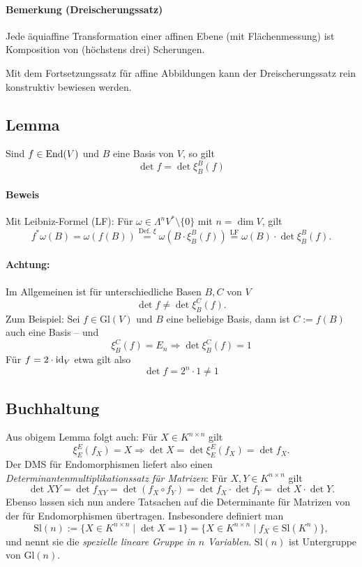 \paragraph{Bemerkung (Dreischerungssatz)}
	Jede äquiaffine Transformation einer affinen Ebene (mit Flächenmessung) ist Komposition von (höchstens drei) Scherungen.
	
	Mit dem Fortsetzungssatz für affine Abbildungen kann der Dreischerungssatz rein konstruktiv bewiesen werden.
\subsection{Lemma}
	Sind $ f\in \operatorname{End}(V) $ und $ B $ eine Basis von $ V $, so gilt
		\[ \det f = \det \xi_B^B(f) \]
\paragraph{Beweis}
	Mit Leibniz-Formel (LF): Für $ \omega\in \Lambda^nV^*\setminus\{0\} $ mit $ n=\dim V $, gilt
		\[ f^*\omega(B) = \omega(f(B)) \overset{\text{Def. }\xi}{=} \omega(B\cdot \xi_B^B(f))
		\overset{\text{LF}}{=} \omega(B)\cdot \det \xi_B^B(f).\]
\paragraph{Achtung:}
	Im Allgemeinen ist für unterschiedliche Basen $ B,C $ von $ V $
		\[ \det f \neq \det \xi_B^C(f). \]
	Zum Beispiel: Sei $ f\in \mathrm{Gl}(V) $ und $ B $ eine beliebige Basis, dann ist $ C:=f(B) $ auch eine Basis -- und 
		\[ \xi_B^C(f) = E_n \Rightarrow \det \xi_B^C(f) = 1 \]
	Für $ f=2\cdot \operatorname{id}_V $ etwa gilt also
		\[ \det f = 2^n \cdot 1\neq 1 \]
\subsection{Buchhaltung}
	Aus obigem Lemma folgt auch:
	Für $ X\in K^{n\times n} $ gilt
		\[ \xi_E^E(f_X) = X \Rightarrow \det X = \det \xi_E^E(f_X) = \det f_X. \]
	Der DMS für Endomorphismen liefert also einen \emph{Determinantenmultiplikationssatz für Matrizen}: Für $ X,Y\in K^{n\times n} $ gilt
		\[ \det XY = \det f_{XY} = \det(f_X\circ f_Y) = \det f_X\cdot \det f_Y = \det X\cdot \det Y. \]
	Ebenso lassen sich nun andere Tatsachen auf die Determinante für Matrizen von der für Endomorphismen übertragen. Insbesondere definiert man
		\[ \mathrm{Sl}(n) := \{X\in K^{n\times n}\mid \det X=1 \} = \{X\in K^{n\times n}\mid f_X\in \mathrm{Sl}(K^n)\}, \]
	und nennt sie die \emph{spezielle lineare Gruppe in $n$ Variablen}. $ \mathrm{Sl}(n) $ ist Untergruppe von $ \mathrm{Gl}(n) $.
